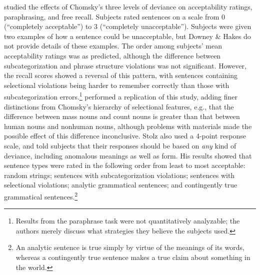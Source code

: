 \citet{DowneyEtAl1968} studied the effects of Chomsky's three levels of deviance on acceptability ratings, paraphrasing, and free recall. Subjects rated sentences on a scale from 0 (``completely acceptable'') to 3 (``completely unacceptable''). Subjects were given two examples of how a sentence could be unacceptable, but Downey \& Hakes do not provide details of these examples. The order among subjects' mean acceptability ratings was as predicted, although the difference between subcategorization and phrase structure violations was not significant. However, the recall scores showed a reversal of this pattern, with sentences containing selectional violations being harder to remember correctly than those with subcategorization errors.\footnote{Results from the paraphrase task were not quantitatively analyzable; the authors merely discuss what strategies they believe the subjects used.}
 \citet{Stolz1969} performed a replication of this study, adding finer distinctions from Chomsky's hierarchy of selectional features, e.g., that the difference between mass nouns and count nouns is greater than that between human nouns and nonhuman nouns, although problems with materials made the possible effect of this difference inconclusive. Stolz also used a 4-point response scale, and told subjects that their responses should be based on \textit{any} kind of deviance, including anomalous meanings as well as form. His results showed that sentence types were rated in the following order from least to most acceptable: random strings; sentences with subcategorization violations; sentences with selectional violations; analytic  grammatical sentences; and contingently true grammatical sentences.\footnote{ An analytic sentence is true simply by virtue of the meanings of its words, whereas a contingently true sentence makes a true claim about something in the world.
}


